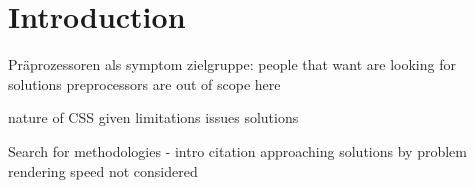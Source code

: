 \chapter{Introduction}
Präprozessoren als symptom
zielgruppe: people that want are looking for solutions
preprocessors are out of scope here

nature of CSS
given limitations
issues
solutions

Search for methodologies - intro citation
approaching solutions by problem
rendering speed not considered
